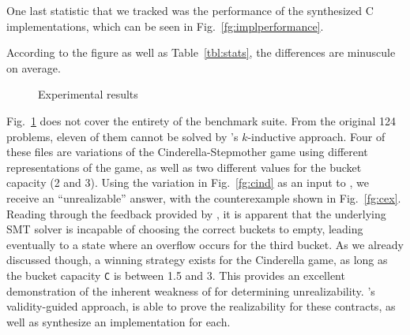 One last statistic that we tracked was the performance of the synthesized C
implementations, which can be seen in Fig.~\ref{fg:implperformance}.
 \iffalse
  For this purpose, we translated the
 generated witnesses from \jsyn and \jsynvg solutions using
 \smtlibtoc under the same set of options.
 \fi
 According to the figure as well as Table~\ref{tbl:stats}, the differences are minuscule on average.
\iffalse
while \jsyn implementations are faster, the difference is minuscule on average.
This small difference may occur due to the fact that \jsyn creates separate skolem functions for the initial evaluation
(when \%init is true)

and subsequent evaluations, whereas currently \jsynvg uses a single function for both cases, and as such requires the evaluation of richer expressions prior to choosing a proper reaction.
\fi


\begin{figure}[!t]
\centering
{}
\quad
{}
\quad
{}
\caption{Experimental results}
\vspace{-5pt}
\label{fg:results}
\end{figure}


Fig.~\ref{fg:results} does not cover the entirety of the
benchmark suite. From the original 124 problems, eleven of them cannot be
solved by \jsyn's $k$-inductive approach.
Four of these files are variations of
the Cinderella-Stepmother game using different representations of the game, as well as two different values
for the bucket capacity (2 and 3). Using the variation in Fig.~\ref{fg:cind} as an input to \jsyn, we receive an ``unrealizable'' answer, with the counterexample shown
in Fig.~\ref{fg:cex}. Reading through the feedback provided by \jsyn, it is
apparent that the underlying SMT solver is incapable of choosing the correct
buckets to empty, leading eventually to a state where an overflow occurs for the
third bucket. As we already discussed though, a winning strategy exists for the
Cinderella game, as long as the bucket capacity \texttt{C} is between 1.5 and 3. This
provides an excellent demonstration of the inherent weakness of \jsyn
for determining unrealizability. \jsynvg's validity-guided approach,
is able to prove the realizability for these contracts, as
well as synthesize an implementation for each.

